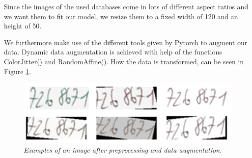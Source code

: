 \begin{table}
\caption{\label{table_string_lengths} {\it Summary of string length distribution.}}
\vspace{2mm}
\hspace{1mm}
\end{table}

Since the images of the used databases come in lots of different aspect ratios and we want them to fit our model, we resize them to a fixed width of 120 and an height of 50.

 We furthermore make use of the different tools given by Pytorch to augment our data. Dynamic data augmentation is achieved with help of the functions ColorJitter() and RandomAffine(). How the data is transformed, can be seen in Figure \ref{fig:dataAug}.

\begin{figure}
  \includegraphics[width=\linewidth]{images/Data-Augmentation.png}
  \caption{\it Examples of an image after preprocessing and data augmentation.}
  \label{fig:dataAug}
\end{figure}